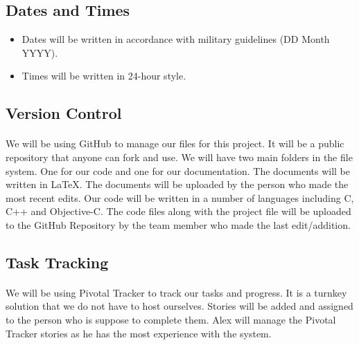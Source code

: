 \subsection{Dates and Times}
\begin{itemize}
\item Dates will be written in accordance with military guidelines (DD Month YYYY).
\item Times will be written in 24-hour style.
\end{itemize}
\subsection{Version Control}
\paragraph{} We will be using GitHub to manage our files for this project. It will be a public repository that anyone can fork and use. We will have two main folders in the file system. One for our code and one for our documentation. The documents will be written in \LaTeX. The documents will be uploaded by the person who made the most recent edits. Our code will be written in a number of languages including C, C++ and Objective-C. The code files along with the project file will be uploaded to the GitHub Repository by the team member who made the last edit/addition.
\subsection{Task Tracking}
\paragraph{} We will be using Pivotal Tracker to track our tasks and progress. It is a turnkey solution that we do not have to host ourselves. Stories will be added and assigned to the person who is suppose to complete them. Alex will manage the Pivotal Tracker stories as he has the most experience with the system.
